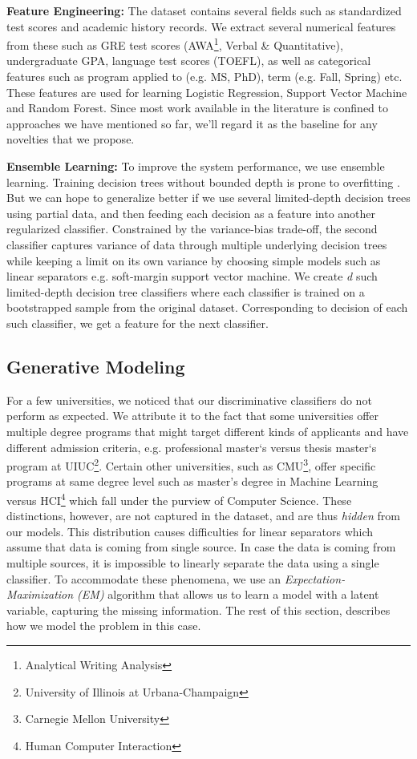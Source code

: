 \documentclass{sig-alternate-05-2015}
\begin{document}
\textbf{Feature Engineering:}
The dataset contains several fields such as standardized test scores and academic history records. We extract several numerical features from these such as GRE test scores (AWA\footnote{Analytical Writing Analysis}, Verbal \& Quantitative), undergraduate GPA, language test scores (TOEFL), as well as categorical features such as program applied to (e.g. MS, PhD), term (e.g. Fall, Spring) etc. These features are used for learning Logistic Regression, Support Vector Machine and Random Forest. Since most work available in the literature is confined to approaches we have mentioned so far, we'll regard it as the baseline for any novelties that we propose.

\textbf{Ensemble Learning:}
To improve the system performance, we use ensemble learning. Training decision trees without bounded depth is prone to overfitting \cite{tree-overfitting}. But we can hope to generalize better if we use several limited-depth decision trees using partial data, and then feeding each decision as a feature into another regularized classifier. Constrained by the variance-bias trade-off, the second classifier captures variance of data through multiple underlying decision trees while keeping a limit on its own variance by choosing simple models such as linear separators e.g. soft-margin support vector machine. We create \textit{d} such limited-depth decision tree classifiers where each classifier is trained on a bootstrapped sample from the original dataset. Corresponding to decision of each such classifier, we get a feature for the next classifier.


\subsection{Generative Modeling}
\label{subsec:generative-modeling}
For a few universities, we noticed that our discriminative classifiers do not perform as expected. We attribute it to the fact that some universities offer multiple degree programs that might target different kinds of applicants and have different admission criteria, e.g. professional master`s versus thesis master`s program at UIUC\footnote{University of Illinois at Urbana-Champaign}. Certain other universities, such as CMU\footnote{Carnegie Mellon University}, offer specific programs at same degree level such as master's degree in Machine Learning versus HCI\footnote{Human Computer Interaction} which fall under the purview of Computer Science. These distinctions, however, are not captured in the dataset, and are thus \textit{hidden} from our models. This distribution causes difficulties for linear separators which assume that data is coming from single source. In case the data is coming from multiple sources, it is impossible to linearly separate the data using a single classifier. To accommodate these phenomena, we use an \textit{Expectation-Maximization (EM)} algorithm that allows us to learn a model with a latent variable, capturing the missing information. The rest of this section, describes how we model the problem in this case.
\end{document}
